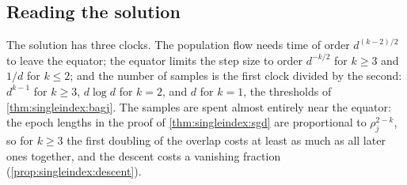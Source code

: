 \begin{refsection}
\section{Reading the solution}\label{sec:singleindex:reading}

The solution has three clocks. The population flow needs time of order $d^{(k-2)/2}$ to leave the equator; the equator limits the step size to order $d^{-k/2}$ for $k\ge3$ and $1/d$ for $k\le2$; and the number of samples is the first clock divided by the second: $d^{k-1}$ for $k\ge3$, $d\log d$ for $k=2$, and $d$ for $k=1$, the thresholds of \cref{thm:singleindex:bagj}. The samples are spent almost entirely near the equator: the epoch lengths in the proof of \cref{thm:singleindex:sgd} are proportional to $\rho_j^{2-k}$, so for $k\ge3$ the first doubling of the overlap costs at least as much as all later ones together, and the descent costs a vanishing fraction (\cref{prop:singleindex:descent}).


\end{refsection}
